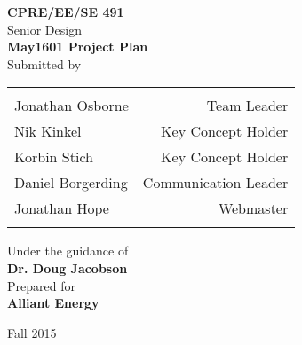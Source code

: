 \begin{titlepage}

\begin{center}

\textup{\small {\bf CPRE/EE/SE 491} \\ Senior Design}\\[0.2in]

\Large \textbf {May1601 Project Plan}\\[0.5in]

\normalsize Submitted by \\
\begin{table}[h]
\centering
\begin{tabular}{lr}\hline \\
Jonathan Osborne & Team Leader \\
Nik Kinkel & Key Concept Holder \\ 
Korbin Stich & Key Concept Holder \\ 
Daniel Borgerding & Communication Leader \\ 
Jonathan Hope & Webmaster \\
\\ \hline

\end{tabular}
\end{table}

\vspace{.1in}
Under the guidance of\\
{\textbf{Dr. Doug Jacobson}}\\[0.2in]

\vspace{.1in}
Prepared for\\
{\textbf{Alliant Energy}}\\[0.2in]

\vfill

\vspace{0.2cm}
Fall 2015

\end{center}

\end{titlepage}
